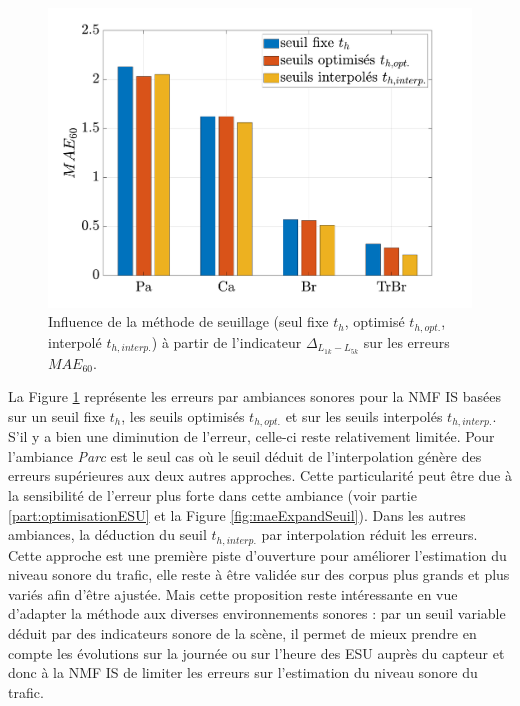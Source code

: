 \begin{figure}[h]
\centering
\includegraphics[width=.7\linewidth]{./figures/resultats/erreursSeuilOpt.pdf}
\caption{Influence de la méthode de seuillage (seul fixe $t_h$, optimisé $t_{h,opt.}$, interpolé $t_{h,interp.}$) à partir de l'indicateur $\Delta_{L_{1k}-L_{5k}}$ sur les erreurs $MAE_{60}$.}
\label{fig:erreurInterp}
\end{figure}

La Figure \ref{fig:erreurInterp} représente les erreurs par ambiances sonores pour la NMF IS basées sur un seuil fixe $t_h$, les seuils optimisés $t_{h,opt.}$ et sur les seuils interpolés $t_{h,interp.}$. S'il y a bien une diminution de l'erreur, celle-ci reste relativement limitée. Pour l'ambiance \textit{Parc} est le seul cas où le seuil déduit de l'interpolation génère des erreurs supérieures aux deux autres approches. Cette particularité peut être due à la sensibilité de l'erreur plus forte dans cette ambiance (voir partie \ref{part:optimisationESU} et la Figure \ref{fig:maeExpandSeuil}). Dans les autres ambiances, la déduction du seuil $t_{h,interp.}$ par interpolation réduit les erreurs. \\

Cette approche est une première piste d'ouverture pour améliorer l'estimation du niveau sonore du trafic, elle reste à être validée sur des corpus plus grands et plus variés afin d'être ajustée. 
Mais cette proposition reste intéressante en vue d'adapter la méthode aux diverses environnements sonores : par un seuil variable déduit par des indicateurs sonore de la scène, il permet de mieux prendre en compte les évolutions sur la journée ou sur l'heure des ESU auprès du capteur et donc à la NMF IS de limiter les erreurs sur l'estimation du niveau sonore du trafic.